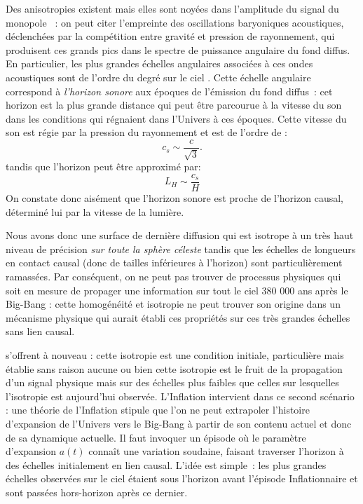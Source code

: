 Des anisotropies existent mais elles sont noyées dans l'amplitude du signal du monopole~ : on peut citer l'empreinte des oscillations baryoniques acoustiques, déclenchées par la compétition entre gravité et pression de rayonnement, qui produisent ces grands pics dans le spectre de puissance angulaire du fond diffus. En particulier, les plus grandes échelles angulaires associées à ces ondes acoustiques  sont de l'ordre du degré sur le ciel . Cette échelle angulaire correspond à \textit{l'horizon sonore} aux époques de l'émission du fond diffus~: cet horizon est la plus grande distance qui peut être parcourue à la vitesse du son dans les conditions qui régnaient dans l'Univers à ces époques. Cette vitesse du son est régie par la pression du rayonnement et est de l'ordre de :
\begin{equation}
c_s\sim \frac{c}{\sqrt 3}.
\end{equation}
tandis que l'horizon peut être approximé par:
\begin{equation}
L_H\sim\frac{c_s}{H}
\end{equation}
On constate donc aisément que l'horizon sonore est proche de l'horizon causal, déterminé lui par la vitesse de la lumière.

Nous avons donc une surface de dernière diffusion qui est isotrope à un très haut niveau de précision \textit{sur toute la sphère céleste} tandis que les échelles de longueurs en contact causal (donc de tailles inférieures à l'horizon) sont particulièrement ramassées. Par conséquent, on ne peut pas trouver de processus physiques qui soit en mesure de propager une information sur tout le ciel 380 000 ans après le Big-Bang : cette homogénéité et isotropie ne peut trouver son origine dans un mécanisme physique qui aurait établi ces propriétés sur ces très grandes échelles sans lien causal.

 s'offrent à nouveau : cette isotropie est une condition initiale, particulière mais établie sans raison aucune ou bien cette isotropie est le fruit de la propagation d'un signal physique mais sur des échelles plus faibles que celles sur lesquelles l'isotropie est aujourd'hui observée. L'Inflation intervient dans ce second scénario : une théorie de l'Inflation stipule que l'on ne peut extrapoler l'histoire d'expansion de l'Univers vers le Big-Bang à partir de son contenu actuel et donc de sa dynamique actuelle. Il faut invoquer un épisode où le paramètre d'expansion $a(t)$ connaît une variation soudaine, faisant traverser l'horizon à des échelles initialement en lien causal. L'idée est simple~: les plus grandes échelles observées sur le ciel étaient sous l'horizon avant l'épisode Inflationnaire et sont passées hors-horizon après ce dernier. 

